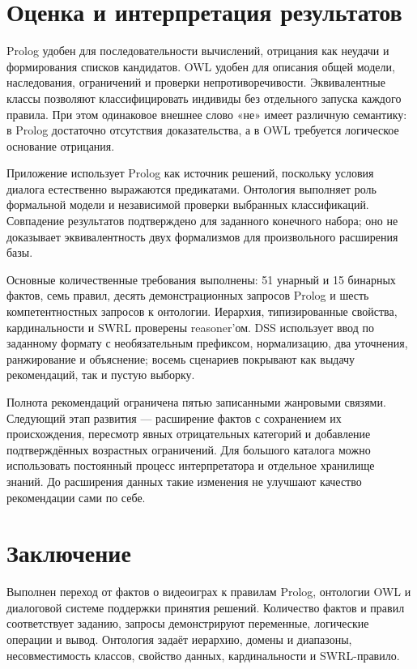 \section{Оценка и интерпретация результатов}
Prolog удобен для последовательности вычислений, отрицания как неудачи
и формирования списков кандидатов. OWL удобен для описания общей модели,
наследования, ограничений и проверки непротиворечивости. Эквивалентные классы
позволяют классифицировать индивиды без отдельного запуска каждого правила.
При этом одинаковое внешнее слово «не» имеет различную семантику:
в Prolog достаточно отсутствия доказательства, а в OWL требуется логическое
основание отрицания.

Приложение использует Prolog как источник решений, поскольку условия диалога
естественно выражаются предикатами. Онтология выполняет роль формальной модели
и независимой проверки выбранных классификаций. Совпадение результатов
подтверждено для заданного конечного набора; оно не доказывает эквивалентность
двух формализмов для произвольного расширения базы.

Основные количественные требования выполнены: 51 унарный и 15 бинарных
фактов, семь правил, десять демонстрационных запросов Prolog и шесть
компетентностных запросов к онтологии. Иерархия, типизированные свойства,
кардинальности и SWRL проверены reasoner'ом. DSS использует ввод по заданному
формату с необязательным префиксом, нормализацию, два уточнения,
ранжирование и объяснение; восемь сценариев
покрывают как выдачу рекомендаций, так и пустую выборку.

Полнота рекомендаций ограничена пятью записанными жанровыми связями.
Следующий этап развития --- расширение фактов с сохранением их происхождения,
пересмотр явных отрицательных категорий и добавление подтверждённых возрастных
ограничений. Для большого каталога можно использовать постоянный процесс
интерпретатора и отдельное хранилище знаний. До расширения данных такие
изменения не улучшают качество рекомендации сами по себе.

\clearpage\section{Заключение}
Выполнен переход от фактов о видеоиграх к правилам Prolog, онтологии OWL
и диалоговой системе поддержки принятия решений. Количество фактов и правил
соответствует заданию, запросы демонстрируют переменные, логические операции
и вывод. Онтология задаёт иерархию, домены и диапазоны, несовместимость классов,
свойство данных, кардинальности и SWRL-правило.

